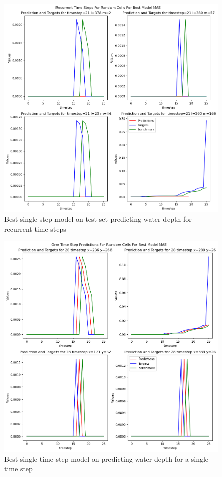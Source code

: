 \begin{figure}[tbph]
	\centering
	\includegraphics[width=0.8\linewidth, height=0.3\textheight]{Figures/Results/Final_Results/Best_Model_SS_recurrent_random_cell}
	\caption[Best single step model on test set predicting water depth for recurrent time steps]{Best single step model on test set predicting water depth for recurrent time steps}
	\label{fig:BSMR}
\end{figure}

\begin{figure}[tbph]
	\centering
	\includegraphics[width=0.8\linewidth, height=0.3\textheight]{Figures/Results/Final_Results/Best_Model_SS_SS_random_cell}
	\caption[Best single time step model on predicting water depth for a single time step]{Best single time step model on predicting water depth for a single time step}
	\label{fig:BSMS}
\end{figure}

